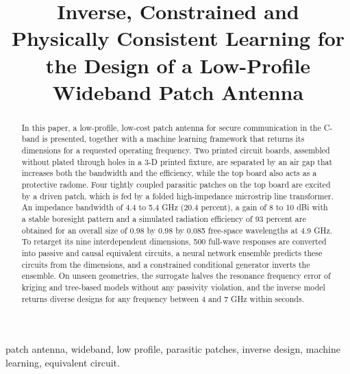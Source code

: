 \documentclass[conference,a4paper]{IEEEtran}
\begin{document}
\title{Inverse, Constrained and Physically Consistent Learning for the Design of a Low-Profile Wideband Patch Antenna}

\author{
}

\maketitle

\begin{abstract}
In this paper, a low-profile, low-cost patch antenna for secure communication in the C-band is presented, together with a machine learning framework that returns its dimensions for a requested operating frequency. Two printed circuit boards, assembled without plated through holes in a 3-D printed fixture, are separated by an air gap that increases both the bandwidth and the efficiency, while the top board also acts as a protective radome. Four tightly coupled parasitic patches on the top board are excited by a driven patch, which is fed by a folded high-impedance microstrip line transformer. An impedance bandwidth of 4.4 to 5.4 GHz (20.4 percent), a gain of 8 to 10 dBi with a stable boresight pattern and a simulated radiation efficiency of 93 percent are obtained for an overall size of 0.98 by 0.98 by 0.085 free-space wavelengths at 4.9 GHz. To retarget its nine interdependent dimensions, 500 full-wave responses are converted into passive and causal equivalent circuits, a neural network ensemble predicts these circuits from the dimensions, and a constrained conditional generator inverts the ensemble. On unseen geometries, the surrogate halves the resonance frequency error of kriging and tree-based models without any passivity violation, and the inverse model returns diverse designs for any frequency between 4 and 7 GHz within seconds.
\end{abstract}

\baselineskip

\begin{IEEEkeywords}
patch antenna, wideband, low profile, parasitic patches, inverse design, machine learning, equivalent circuit.
\end{IEEEkeywords}
\end{document}
